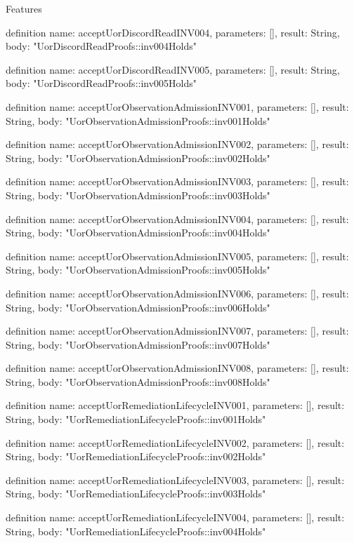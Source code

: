 \begin{lexlean}{Features}
\begin{semanticmodule}
definition{
  name: acceptUorDiscordReadINV004,
  parameters: [],
  result: String,
  body: "UorDiscordReadProofs::inv004Holds"
}

definition{
  name: acceptUorDiscordReadINV005,
  parameters: [],
  result: String,
  body: "UorDiscordReadProofs::inv005Holds"
}

definition{
  name: acceptUorObservationAdmissionINV001,
  parameters: [],
  result: String,
  body: "UorObservationAdmissionProofs::inv001Holds"
}

definition{
  name: acceptUorObservationAdmissionINV002,
  parameters: [],
  result: String,
  body: "UorObservationAdmissionProofs::inv002Holds"
}

definition{
  name: acceptUorObservationAdmissionINV003,
  parameters: [],
  result: String,
  body: "UorObservationAdmissionProofs::inv003Holds"
}

definition{
  name: acceptUorObservationAdmissionINV004,
  parameters: [],
  result: String,
  body: "UorObservationAdmissionProofs::inv004Holds"
}

definition{
  name: acceptUorObservationAdmissionINV005,
  parameters: [],
  result: String,
  body: "UorObservationAdmissionProofs::inv005Holds"
}

definition{
  name: acceptUorObservationAdmissionINV006,
  parameters: [],
  result: String,
  body: "UorObservationAdmissionProofs::inv006Holds"
}

definition{
  name: acceptUorObservationAdmissionINV007,
  parameters: [],
  result: String,
  body: "UorObservationAdmissionProofs::inv007Holds"
}

definition{
  name: acceptUorObservationAdmissionINV008,
  parameters: [],
  result: String,
  body: "UorObservationAdmissionProofs::inv008Holds"
}

definition{
  name: acceptUorRemediationLifecycleINV001,
  parameters: [],
  result: String,
  body: "UorRemediationLifecycleProofs::inv001Holds"
}

definition{
  name: acceptUorRemediationLifecycleINV002,
  parameters: [],
  result: String,
  body: "UorRemediationLifecycleProofs::inv002Holds"
}

definition{
  name: acceptUorRemediationLifecycleINV003,
  parameters: [],
  result: String,
  body: "UorRemediationLifecycleProofs::inv003Holds"
}

definition{
  name: acceptUorRemediationLifecycleINV004,
  parameters: [],
  result: String,
  body: "UorRemediationLifecycleProofs::inv004Holds"
}


\end{semanticmodule}
\end{lexlean}
